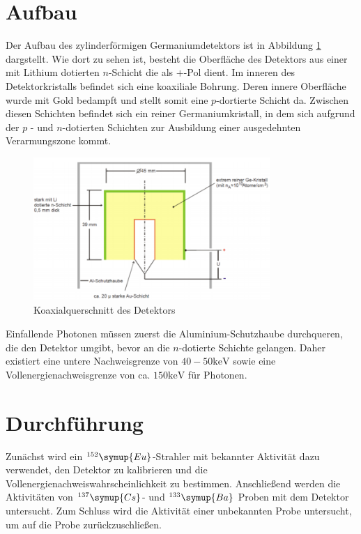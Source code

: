 \section{Aufbau}
Der Aufbau des zylinderförmigen Germaniumdetektors ist in Abbildung \ref{fig:Aufbau} dargstellt. Wie dort zu sehen ist, besteht die Oberfläche des Detektors aus einer mit Lithium dotierten $n$-Schicht die als $+$-Pol dient. Im inneren des Detektorkristalls befindet sich eine koaxiliale Bohrung. Deren innere Oberfläche wurde mit Gold bedampft und stellt somit eine $p$-dortierte Schicht da. Zwischen diesen Schichten befindet sich ein reiner Germaniumkristall, in dem sich aufgrund der $p$ - und $n$-dotierten Schichten zur Ausbildung einer ausgedehnten Verarmungszone kommt. 
\begin{figure}[H]
    \centering
    \includegraphics[width=0.8\textwidth]{content/images/Aufbau.png}
    \caption{Koaxialquerschnitt des Detektors \cite{anleitung} }
    \label{fig:Aufbau}
\end{figure}
Einfallende Photonen müssen zuerst die Aluminium-Schutzhaube durchqueren, die den Detektor umgibt, bevor an die $n$-dotierte Schichte gelangen. Daher existiert eine untere Nachweisgrenze von $40-50 \si{\kilo \electronvolt}$ sowie eine Vollenergienachweisgrenze von ca. $150 \si{\kilo \electronvolt}$ für Photonen.

\section{Durchführung}
Zunächst wird ein $^{152}\symup{Eu}$-Strahler mit bekannter Aktivität dazu verwendet, den Detektor zu kalibrieren und die Vollenergienachweiswahrscheinlichkeit zu bestimmen. Anschließend werden die Aktivitäten von $^{137}\symup{Cs}$- und  $ ^{133}\symup{Ba} $ Proben mit dem Detektor untersucht. Zum Schluss wird die Aktivität einer unbekannten Probe untersucht, um auf die Probe zurückzuschließen. 